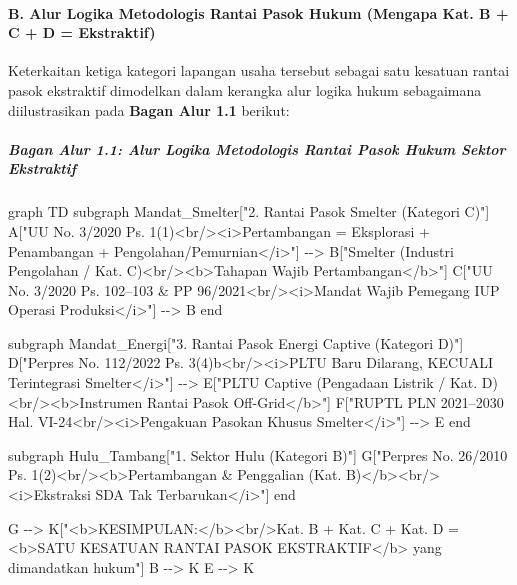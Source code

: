\documentclass[
]{article}
\newenvironment{Shaded}{}{}
\newcommand{\NormalTok}[1]{#1}
\begin{document}
\paragraph{B. Alur Logika Metodologis Rantai Pasok Hukum (Mengapa Kat. B
+ C + D =
Ekstraktif)}\label{b.-alur-logika-metodologis-rantai-pasok-hukum-mengapa-kat.-b-c-d-ekstraktif}

Keterkaitan ketiga kategori lapangan usaha tersebut sebagai satu
kesatuan rantai pasok ekstraktif dimodelkan dalam kerangka alur logika
hukum sebagaimana diilustrasikan pada \textbf{Bagan Alur 1.1} berikut:

\subparagraph{Bagan Alur 1.1: Alur Logika Metodologis Rantai Pasok Hukum
Sektor
Ekstraktif}\label{bagan-alur-1.1-alur-logika-metodologis-rantai-pasok-hukum-sektor-ekstraktif}

\begin{Shaded}
\begin{Highlighting}[]
\NormalTok{graph TD}
\NormalTok{    subgraph Mandat\_Smelter["2. Rantai Pasok Smelter (Kategori C)"]}
\NormalTok{        A["UU No. 3/2020 Ps. 1(1)\textless{}br/\textgreater{}\textless{}i\textgreater{}Pertambangan = Eksplorasi + Penambangan + Pengolahan/Pemurnian\textless{}/i\textgreater{}"] {-}{-}\textgreater{} B["Smelter (Industri Pengolahan / Kat. C)\textless{}br/\textgreater{}\textless{}b\textgreater{}Tahapan Wajib Pertambangan\textless{}/b\textgreater{}"]}
\NormalTok{        C["UU No. 3/2020 Ps. 102–103 \& PP 96/2021\textless{}br/\textgreater{}\textless{}i\textgreater{}Mandat Wajib Pemegang IUP Operasi Produksi\textless{}/i\textgreater{}"] {-}{-}\textgreater{} B}
\NormalTok{    end}

\NormalTok{    subgraph Mandat\_Energi["3. Rantai Pasok Energi Captive (Kategori D)"]}
\NormalTok{        D["Perpres No. 112/2022 Ps. 3(4)b\textless{}br/\textgreater{}\textless{}i\textgreater{}PLTU Baru Dilarang, KECUALI Terintegrasi Smelter\textless{}/i\textgreater{}"] {-}{-}\textgreater{} E["PLTU Captive (Pengadaan Listrik / Kat. D)\textless{}br/\textgreater{}\textless{}b\textgreater{}Instrumen Rantai Pasok Off{-}Grid\textless{}/b\textgreater{}"]}
\NormalTok{        F["RUPTL PLN 2021–2030 Hal. VI{-}24\textless{}br/\textgreater{}\textless{}i\textgreater{}Pengakuan Pasokan Khusus Smelter\textless{}/i\textgreater{}"] {-}{-}\textgreater{} E}
\NormalTok{    end}

\NormalTok{    subgraph Hulu\_Tambang["1. Sektor Hulu (Kategori B)"]}
\NormalTok{        G["Perpres No. 26/2010 Ps. 1(2)\textless{}br/\textgreater{}\textless{}b\textgreater{}Pertambangan \& Penggalian (Kat. B)\textless{}/b\textgreater{}\textless{}br/\textgreater{}\textless{}i\textgreater{}Ekstraksi SDA Tak Terbarukan\textless{}/i\textgreater{}"]}
\NormalTok{    end}

\NormalTok{    G {-}{-}\textgreater{} K["\textless{}b\textgreater{}KESIMPULAN:\textless{}/b\textgreater{}\textless{}br/\textgreater{}Kat. B + Kat. C + Kat. D = \textless{}b\textgreater{}SATU KESATUAN RANTAI PASOK EKSTRAKTIF\textless{}/b\textgreater{} yang dimandatkan hukum"]}
\NormalTok{    B {-}{-}\textgreater{} K}
\NormalTok{    E {-}{-}\textgreater{} K}
\end{Highlighting}
\end{Shaded}
\end{document}
